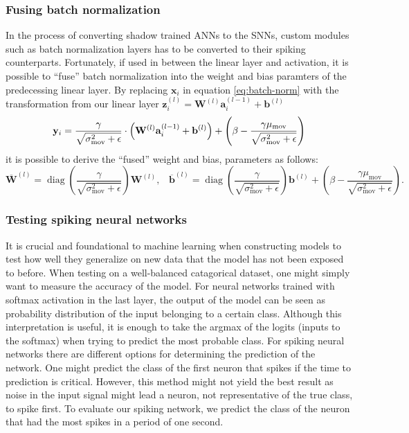 \documentclass[a4paper,11pt]{article} %
\begin{document}
\subsubsection{Fusing batch normalization}
In the process of converting shadow trained ANNs to the SNNs, custom modules such as batch normalization layers has to be converted to their spiking counterparts. Fortunately, if used in between the linear layer and activation, it is possible to ``fuse'' batch normalization into the weight and bias paramters of the predecessing linear layer. By replacing $\mathbf{x}_i$ in equation \ref{eq:batch-norm} with the transformation from our linear layer $\mathbf{z}_i^{(l)} = \mathbf{W}^{(l)} \mathbf{a}^{(l-1)}_i  + \mathbf{b}^{(l)}$ 
\begin{equation}
    \mathbf{y}_i = \frac{\gamma}{\sqrt{\sigma^{2}_\text{mov} +\epsilon}} \cdot \left( 
      \mathbf{W}^{(l)} \mathbf{a}^{(l-1)}_i  + \mathbf{b}^{(l)}
    \right) + \left(\beta - \frac{\gamma \mu_\text{mov}}{\sqrt{\sigma^{2}_\text{mov}+\epsilon}}\right) \\
\end{equation}
it is possible to derive the ``fused'' weight and bias, parameters as follows:
\begin{equation}
    \overline{\mathbf{W}}^{(l)} = \operatorname{diag} \left( \frac{\gamma}{\sqrt{\sigma^{2}_\text{mov} +\epsilon}} \right) \mathbf{W}^{(l)}, \hspace{10pt} \overline{\mathbf{b}}^{(l)} =  \operatorname{diag} \left( \frac{\gamma}{\sqrt{\sigma^{2}_\text{mov} +\epsilon}} \right) \mathbf{b}^{(l)} + \left(\beta - \frac{\gamma \mu_\text{mov}}{\sqrt{\sigma^{2}_\text{mov}+\epsilon}}\right).
\end{equation}

\subsubsection{Testing spiking neural networks}
It is crucial and foundational to machine learning when constructing models to test how well they generalize on new data that the model has not been exposed to before. When testing on a well-balanced catagorical dataset, one might simply want to measure the accuracy of the model. For neural networks trained with softmax activation in the last layer, the output of the model can be seen as probability distribution of the input belonging to a certain class. Although this interpretation is useful, it is enough to take the argmax of the logits (inputs to the softmax) when trying to predict the most probable class. For spiking neural networks there are different options for determining the prediction of the network. One might predict the class of the first neuron that spikes if the time to prediction is critical. However, this method might not yield the best result as noise in the input signal might lead a neuron, not representative of the true class, to spike first. To evaluate our spiking network, we predict the class of the neuron that had the most spikes in a period of one second.
\end{document}
